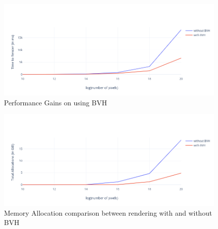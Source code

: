 \documentclass{juliacon}
\begin{document}

\begin{figure}[!htb]
    \centering
    \includegraphics[width=\textwidth]{images/performance-speed.png}
    \caption{Performance Gains on using BVH}
    \label{fig:bvh_perf}
\end{figure}

\begin{figure}[!htb]
    \centering
    \includegraphics[width=\textwidth]{images/performance-memory.png}
    \caption{Memory Allocation comparison between rendering with and without BVH}
    \label{fig:bvh_mem}
\end{figure}
\end{document}
